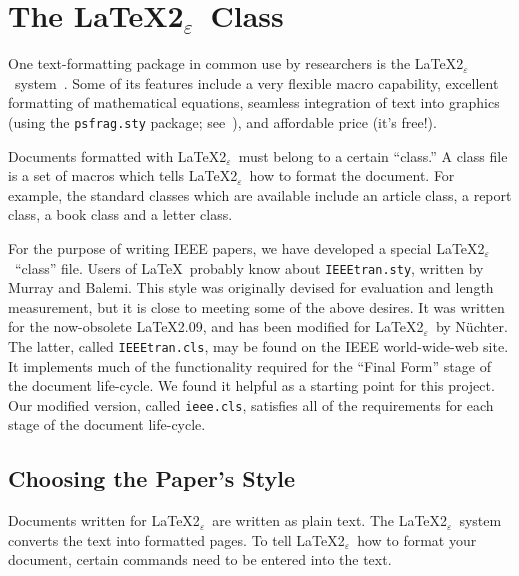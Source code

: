 \documentclass[%
	final,
	reprint,
	notitlepage,
	narroweqnarray,
	inline,
	twoside,
        invited,
	]{ieee}
\newcommand{\latexiie}{\LaTeX2{\Large$_\varepsilon$}}
\begin{document}
\section{The \latexiie\ Class}
\label{sec:latex}

One text-formatting package in common use by researchers is the
\latexiie\ system~\cite{lamport}. Some of its features include a very
flexible macro capability, excellent formatting of mathematical
equations, seamless integration of text into graphics (using the
\texttt{psfrag.sty} package; see~\cite{goossens}), and affordable
price (it's free!).

Documents formatted with \latexiie\ must belong to a certain ``class.''
A class file is a set of macros which tells \latexiie\ how to format
the document. For example, the standard classes which are available
include an article class, a report class, a book class and a letter
class.

For the purpose of writing IEEE papers, we have developed a special
\latexiie\ ``class'' file. Users of \LaTeX\ probably know about
\texttt{IEEEtran.sty}, written by Murray and Balemi. This style was 
originally devised for evaluation and length measurement, but it is
close to meeting some of the above desires. It was written for the
now-obsolete \LaTeX 2.09, and has been modified for \latexiie\ by
N\"{u}chter. The latter, called \texttt{IEEEtran.cls}, may be found on
the IEEE world-wide-web site.  It implements much of the functionality
required for the ``Final Form'' stage of the document life-cycle. We
found it helpful as a starting point for this project. Our modified
version, called \texttt{ieee.cls}, satisfies all of the requirements
for each stage of the document life-cycle.

\subsection{Choosing the Paper's Style}

Documents written for \latexiie\ are written as plain text. The
\latexiie\ system converts the text into formatted pages. To tell
\latexiie\ how to format your document, certain commands need to be
entered into the text.
\end{document}
